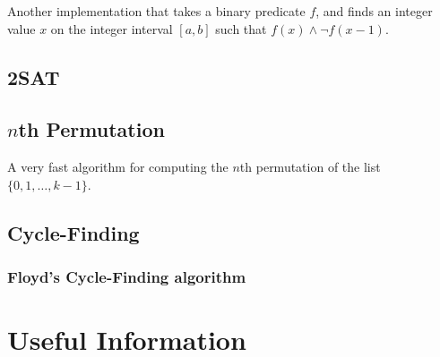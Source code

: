 \documentclass[10pt,a4paper,titlepage]{article}
\begin{document}
			Another implementation that takes a binary predicate $f$, and finds an integer value $x$ on the integer interval $[a,b]$ such that $f(x) \land \lnot f(x - 1)$.
			

		\subsection{2SAT}
			

		\subsection{$n$th Permutation}
			A very fast algorithm for computing the $n$th permutation of the list $\{0,1,\ldots,k-1\}$.
			

		\subsection{Cycle-Finding}
			\subsubsection{Floyd's Cycle-Finding algorithm}
				

	\section{Useful Information}
\end{document}
